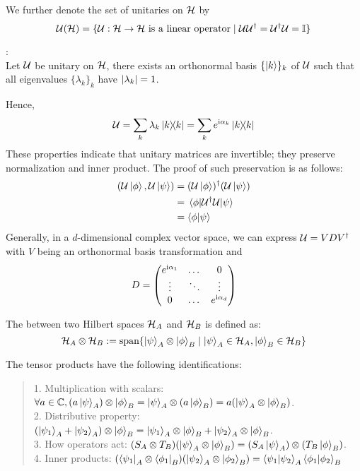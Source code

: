 We further denote the set of unitaries on $\mathcal{H}$ by 
$$\mathcal{U}(\mathcal{H}) = \{\mathcal{U}: \mathcal{H} \to \mathcal{H} \text{ is a linear operator} \mid \mathcal{U}\mathcal{U}^{\dagger} = \mathcal{U}^{\dagger}\mathcal{U} = \mathbb{I}\}$$
\begin{theorem}
    : \\
    Let $\mathcal{U}$ be unitary on $\mathcal{H}$, there exists an orthonormal basis $\{\ket{k}\}_k$ of $\mathcal{U}$ such that all eigenvalues $\{\lambda_k\}_k$ have $\abs{\lambda_k} = 1$.
\end{theorem}
Hence, 
$$\opuni = \Sumi{k} \lambda_k \dyad{k}{k} = \Sumi{k}e^{\imag \alpha_k} \dyad{k}{k}$$
These properties indicate that unitary matrices are invertible; they preserve normalization and inner product. The proof of such preservation is as follows:
\begin{align*}
    (\mathcal{U} \ket{\phi}, \mathcal{U} \ket{\psi}) &= (\mathcal{U} \ket{\phi})^{\dagger} (\mathcal{U} \ket{\psi}) \\
    &= \mel{\phi}{\mathcal{U}^{\dagger}\mathcal{U}}{\psi} \\
    &= \braket{\phi}{\psi}
\end{align*}
Generally, in a $d$-dimensional complex vector space, we can express $\mathcal{U} = VDV^{\dagger}$ with $V$ being an orthonormal basis transformation and
$$D = \begin{pmatrix}
    e^{\mathrm{i} \alpha_1} & \dots & 0 \\
    \vdots & \ddots & \vdots \\
    0 & \dots & e^{\mathrm{i} \alpha_d}
\end{pmatrix}$$
\begin{definition}
    The  between two Hilbert spaces $\mathcal{H}_A$ and $\mathcal{H}_B$ is defined as:
    $$\mathcal{H}_A \otimes \mathcal{H}_B := \text{span}\{\ket{\psi}_A \otimes \ket{\phi}_B \mid \ket{\psi}_A \in \mathcal{H}_A, \ket{\phi}_B \in \mathcal{H}_B\}$$
\end{definition}
The tensor products have the following identifications:
\begin{quote}
    1. Multiplication with scalars: $\forall a \in \mathbb{C}, (a \ket{\psi}_A) \otimes \ket{\phi}_B = \ket{\psi}_A \otimes (a \ket{\phi}_B) = a(\ket{\psi}_A \otimes \ket{\phi}_B)$. \\
    2. Distributive property: $(\ket{\psi_1}_A + \ket{\psi_2}_A) \otimes \ket{\phi}_B = \ket{\psi_1}_A \otimes \ket{\phi}_B + \ket{\psi_2}_A \otimes \ket{\phi}_B$. \\
    3. How operators act: $(S_A \otimes T_B)(\ket{\psi}_A \otimes \ket{\phi}_B) = (S_A \ket{\psi}_A) \otimes (T_B \ket{\phi}_B)$. \\
    4. Inner products: $(\bra{\psi_1}_A \otimes \bra{\phi_1}_B)(\ket{\psi_2}_A \otimes \ket{\phi_2}_B) = \braket{\psi_1}{\psi_2}_A \braket{\phi_1}{\phi_2}_B$
\end{quote}

